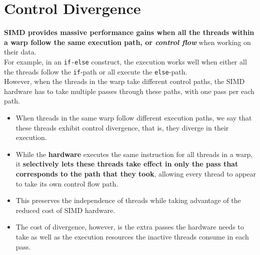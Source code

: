 \section{Control Divergence}
\textbf{SIMD provides massive performance gains when all the threads within a warp follow the same execution path, or \textit{control flow}} when working on their data.\\
For example, in an \texttt{if-else} construct, the execution works well when either all the threads follow the \texttt{if}-path or all execute the \texttt{else}-path.\\
However, when the threads in the warp take different control paths, the SIMD hardware has to take multiple passes through these paths, with one pass per each path.
\begin{itemize}
    \item When threads in the same warp follow different execution paths, we say that these threads exhibit control divergence, that is, they diverge in their execution.
    \item While the \textbf{hardware} executes the same instruction for all threads in a warp, it \textbf{selectively lets these threads take effect in only the pass that corresponds to the path that they took}, allowing every thread to appear to take its own control flow path.
    \item This preserves the independence of threads while taking advantage of the reduced cost of SIMD hardware.
    \item The cost of divergence, however, is the extra passes the hardware needs to take as well as the execution resources the inactive threads consume in each pass.
\end{itemize}
